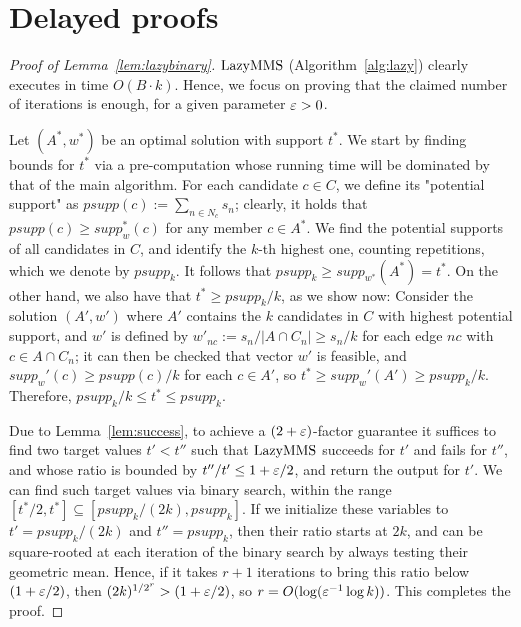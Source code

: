 
\section{Delayed proofs}\label{s:proofs}

\begin{proof}[Proof of Lemma~\ref{lem:lazybinary}]
$\operatorname{LazyMMS}$ (Algorithm~\ref{alg:lazy}) clearly executes in time $O(B\cdot k)$. Hence, we focus on proving that the claimed number of iterations is enough, for a given parameter $\varepsilon>0$.

Let $(A^*, w^*)$ be an optimal solution with support $t^*$. We start by finding bounds for $t^*$ via a pre-computation whose running time will be dominated by that of the main algorithm. For each candidate $c\in C$, we define its "potential support" as $psupp(c):=\sum_{n\in N_c} s_n$; clearly, it holds that $psupp(c)\geq supp_w^*(c)$ for any member $c\in A^*$. We find the potential supports of all candidates in $C$, and identify the $k$-th highest one, counting repetitions, which we denote by $psupp_k$. It follows that $psupp_k\geq supp_{w^*}(A^*)=t^*$. On the other hand, we also have that $t^* \geq psupp_k /k$, as we show now: Consider the solution $(A',w')$ where $A'$ contains the $k$ candidates in $C$ with highest potential support, and $w'$ is defined by $w'_{nc}:=s_n/|A\cap C_n| \geq s_n/k$ for each edge $nc$ with $c\in A\cap C_n$; it can then be checked that vector $w'$ is feasible, and $supp_w'(c)\geq psupp(c)/k$ for each $c\in A'$, so $t^*\geq supp_w'(A')\geq psupp_k/k$. Therefore, $psupp_k/k\leq t^*\leq psupp_k$.

Due to Lemma~\ref{lem:success}, to achieve a $(2+\varepsilon)$-factor guarantee it suffices to find two target values $t'<t''$ such that $\operatorname{LazyMMS}$ succeeds for $t'$ and fails for $t''$, and whose ratio is bounded by $t''/t'\leq 1+\varepsilon/2$, and return the output for $t'$. We can find such target values via binary search, within the range $[t^*/2, t^*]\subseteq [psupp_k/(2k), psupp_k]$. If we initialize these variables to $t'=psupp_k/(2k)$ and $t''=psupp_k$, then their ratio starts at $2k$, and can be square-rooted at each iteration of the binary search by always testing their geometric mean. Hence, if it takes $r+1$ iterations to bring this ratio below $(1+\varepsilon/2)$, then $(2k)^{1/2^r} > (1+\varepsilon/2)$, so $r=O(\log(\varepsilon^{-1}\log k))$. This completes the proof. 
\end{proof}

